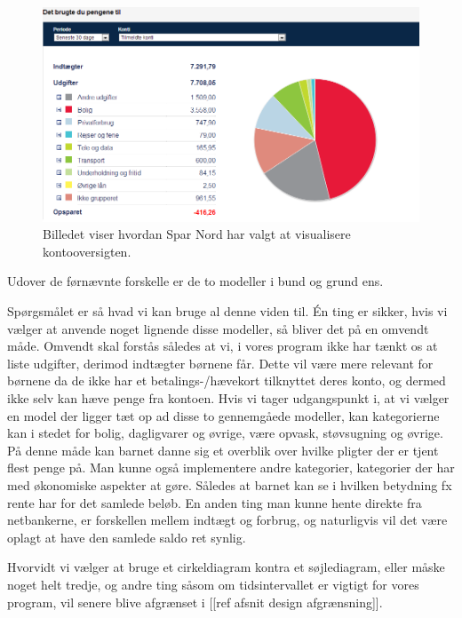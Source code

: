 \begin{figure}[h!]
\centering
\includegraphics[width=1.0\textwidth]{Billeder/SparN.png}
\caption{ Billedet viser hvordan Spar Nord har valgt at visualisere kontooversigten.}
\label{SparN}
\end{figure}

Udover de førnævnte forskelle er de to modeller i bund og grund ens.

Spørgsmålet er så hvad vi kan bruge al denne viden til. Én ting er sikker, hvis vi vælger at anvende noget lignende disse modeller, så bliver det på en omvendt måde. Omvendt skal forstås således at vi, i vores program ikke har tænkt os at liste udgifter, derimod indtægter børnene får. Dette vil være mere relevant for børnene da de ikke har et betalings-/hævekort tilknyttet deres konto, og dermed ikke selv kan hæve penge fra kontoen. Hvis vi tager udgangspunkt i, at vi vælger en model der ligger tæt op ad disse to gennemgåede modeller, kan kategorierne kan i stedet for bolig, dagligvarer og øvrige, være opvask, støvsugning og øvrige. På denne måde kan barnet danne sig et overblik over hvilke pligter der er tjent flest penge på. Man kunne også implementere andre kategorier, kategorier der har med økonomiske aspekter at gøre. Således at barnet kan se i hvilken betydning fx rente har for det samlede beløb. En anden ting man kunne hente direkte fra netbankerne, er forskellen mellem indtægt og forbrug, og naturligvis vil det være oplagt at have den samlede saldo ret synlig. 

Hvorvidt vi vælger at bruge et cirkeldiagram kontra et søjlediagram, eller måske noget helt tredje, og andre ting såsom om tidsintervallet er vigtigt for vores program, vil senere blive afgrænset i [[ref afsnit design afgrænsning]].


















